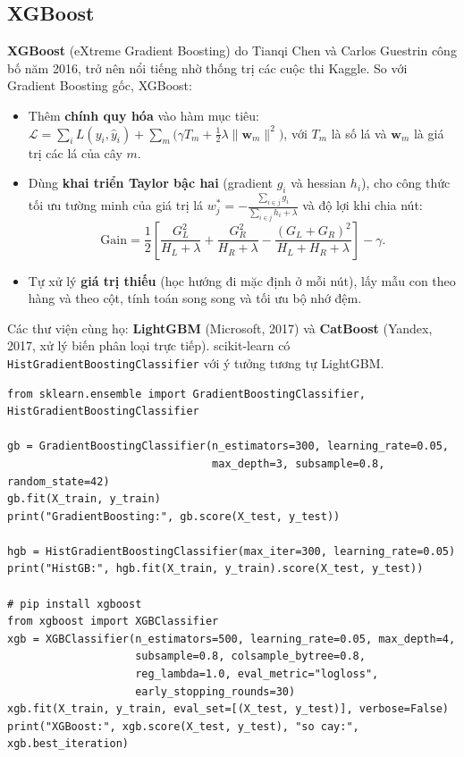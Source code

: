 \subsection{XGBoost}

\textbf{XGBoost} (eXtreme Gradient Boosting) do Tianqi Chen và Carlos Guestrin công bố năm 2016, trở nên nổi tiếng nhờ thống trị các cuộc thi Kaggle. So với Gradient Boosting gốc, XGBoost:
\begin{itemize}
    \item Thêm \textbf{chính quy hóa} vào hàm mục tiêu: $\mathcal{L} = \sum_i L(y_i, \hat{y}_i) + \sum_m \Big(\gamma T_m + \frac{1}{2}\lambda \|\mathbf{w}_m\|^2\Big)$, với $T_m$ là số lá và $\mathbf{w}_m$ là giá trị các lá của cây $m$.
    \item Dùng \textbf{khai triển Taylor bậc hai} (gradient $g_i$ và hessian $h_i$), cho công thức tối ưu tường minh của giá trị lá $w_j^* = -\frac{\sum_{i \in j} g_i}{\sum_{i \in j} h_i + \lambda}$ và độ lợi khi chia nút:
    \begin{equation}
        \text{Gain} = \frac{1}{2}\left[\frac{G_L^2}{H_L + \lambda} + \frac{G_R^2}{H_R + \lambda} - \frac{(G_L + G_R)^2}{H_L + H_R + \lambda}\right] - \gamma .
    \end{equation}
    \item Tự xử lý \textbf{giá trị thiếu} (học hướng đi mặc định ở mỗi nút), lấy mẫu con theo hàng và theo cột, tính toán song song và tối ưu bộ nhớ đệm.
\end{itemize}
Các thư viện cùng họ: \textbf{LightGBM} (Microsoft, 2017) và \textbf{CatBoost} (Yandex, 2017, xử lý biến phân loại trực tiếp). scikit-learn có \texttt{HistGradientBoostingClassifier} với ý tưởng tương tự LightGBM.

\begin{lstlisting}[caption={Gradient Boosting và XGBoost}]
from sklearn.ensemble import GradientBoostingClassifier, HistGradientBoostingClassifier

gb = GradientBoostingClassifier(n_estimators=300, learning_rate=0.05,
                                max_depth=3, subsample=0.8, random_state=42)
gb.fit(X_train, y_train)
print("GradientBoosting:", gb.score(X_test, y_test))

hgb = HistGradientBoostingClassifier(max_iter=300, learning_rate=0.05)
print("HistGB:", hgb.fit(X_train, y_train).score(X_test, y_test))

# pip install xgboost
from xgboost import XGBClassifier
xgb = XGBClassifier(n_estimators=500, learning_rate=0.05, max_depth=4,
                    subsample=0.8, colsample_bytree=0.8,
                    reg_lambda=1.0, eval_metric="logloss",
                    early_stopping_rounds=30)
xgb.fit(X_train, y_train, eval_set=[(X_test, y_test)], verbose=False)
print("XGBoost:", xgb.score(X_test, y_test), "so cay:", xgb.best_iteration)
\end{lstlisting}

